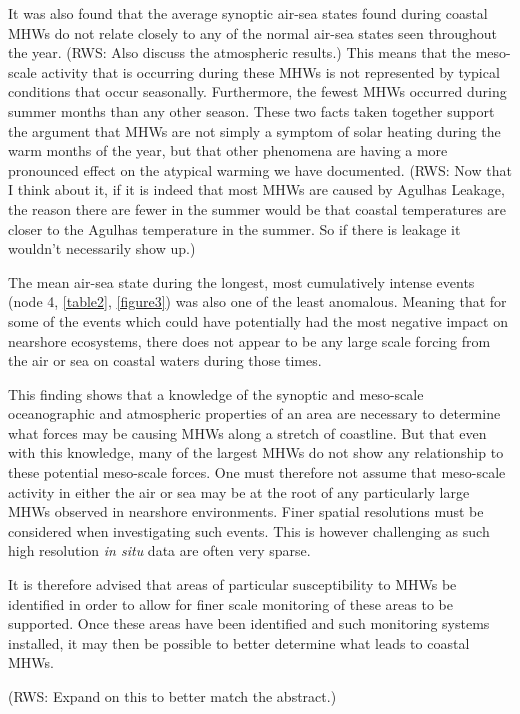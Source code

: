 \documentclass[a4paper,10pt,review]{elsarticle}
\begin{document}
It was also found that the average synoptic air-sea states found during coastal MHWs do not relate closely to any of the normal air-sea states seen throughout the year. (RWS: Also discuss the atmospheric results.) This means that the meso-scale activity that is occurring during these MHWs is not represented by typical conditions that occur seasonally. Furthermore, the fewest MHWs occurred during summer months than any other season. These two facts taken together support the argument that MHWs are not simply a symptom of solar heating during the warm months of the year, but that other phenomena are having a more pronounced effect on the atypical warming we have documented. (RWS: Now that I think about it, if it is indeed that most MHWs are caused by Agulhas Leakage, the reason there are fewer in the summer would be that coastal temperatures are closer to the Agulhas temperature in the summer. So if there is leakage it wouldn't necessarily show up.)

The mean air-sea state during the longest, most cumulatively intense events (node 4, \cref{table2}, \cref{figure3}) was also one of the least anomalous. Meaning that for some of the events which could have potentially had the most negative impact on nearshore ecosystems, there does not appear to be any large scale forcing from the air or sea on coastal waters during those times.

This finding shows that a knowledge of the synoptic and meso-scale oceanographic and atmospheric properties of an area are necessary to determine what forces may be causing MHWs along a stretch of coastline. But that even with this knowledge, many of the largest MHWs do not show any relationship to these potential meso-scale forces. One must therefore not assume that meso-scale activity in either the air or sea may be at the root of any particularly large MHWs observed in nearshore environments. Finer spatial resolutions must be considered when investigating such events. This is however challenging as such high resolution \emph{in situ} data are often very sparse.

It is therefore advised that areas of particular susceptibility to MHWs be identified in order to allow for finer scale monitoring of these areas to be supported. Once these areas have been identified and such monitoring systems installed, it may then be possible to better determine what leads to coastal MHWs. 

(RWS: Expand on this to better match the abstract.)
\end{document}
